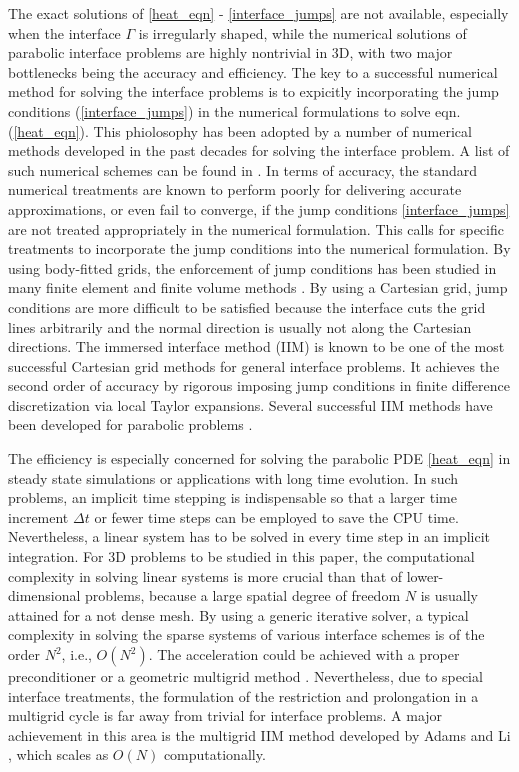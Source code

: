 \documentclass[dissertation]{uathesis}
\begin{document}
\begin{body}
The exact solutions of \eqref{heat_eqn} - \eqref{interface_jumps} are not available, especially when the interface $\Gamma$ is irregularly shaped, while the numerical solutions of parabolic interface problems are highly nontrivial in 3D, with two major bottlenecks being the accuracy and efficiency. The key to a successful numerical method for solving the interface problems is to expicitly incorporating the jump conditions (\ref{interface_jumps}) in the numerical formulations to solve eqn. (\ref{heat_eqn}). This phiolosophy has been adopted by a number of numerical methods developed in the past decades for solving the interface problem. A list of such numerical schemes can be found in \cite{li2017matched}. In terms of accuracy, the standard numerical treatments are known to perform poorly for delivering accurate approximations, or even fail to converge, if the jump conditions \eqref{interface_jumps} are not treated appropriately in the numerical formulation. 
This calls for specific treatments to incorporate the jump conditions into the numerical formulation.
By using body-fitted grids, the enforcement of jump conditions has been studied 
in many finite element and finite volume methods \cite{attanayake2011convergence, chen1998finite, sinha2005optimal, sinha2009finite, wang2010embedded}. 
By using a Cartesian grid,  jump conditions  are more difficult to be satisfied because the interface cuts the grid lines arbitrarily and the normal direction is usually not along the Cartesian directions. 
The immersed interface method (IIM) \cite{leveque1994immersed} is known to be one of the most successful Cartesian grid methods for general interface problems. It achieves the second order of accuracy by rigorous imposing jump conditions in finite difference discretization via local Taylor expansions.
Several successful IIM methods have been developed for parabolic  problems
\cite{adams2002immersed, bouchon2010immersed, bouchon2010immersed2, kandilarov2004immersed, kandilarov2007immersed}. 

The efficiency is especially concerned for solving the parabolic PDE \eqref{heat_eqn} 
in  steady state simulations or applications with long time evolution. 
In such problems, an implicit time stepping is indispensable so that a larger time increment $\Delta t$ or fewer time steps can be employed to save the CPU time. Nevertheless, a linear system has to be solved in every time step in an implicit integration. For 3D problems to be studied in this paper, the computational complexity in solving linear systems is more crucial than that of lower-dimensional problems, because a large  spatial degree of freedom $N$ is usually attained for a not dense mesh. By using a generic iterative solver, a typical complexity in solving the sparse systems of various interface schemes is of the order $N^2$, i.e., $O(N^2)$. The acceleration could be achieved with a proper preconditioner or a geometric multigrid method \cite{horton1995space}. Nevertheless, due to special interface treatments, the formulation of the restriction and prolongation in a multigrid cycle is far away from trivial for interface problems. A major achievement in this area is the multigrid IIM method developed by Adams and Li \cite{adams2002immersed}, which scales as $O(N)$ computationally. 



\end{body}
\end{document}

